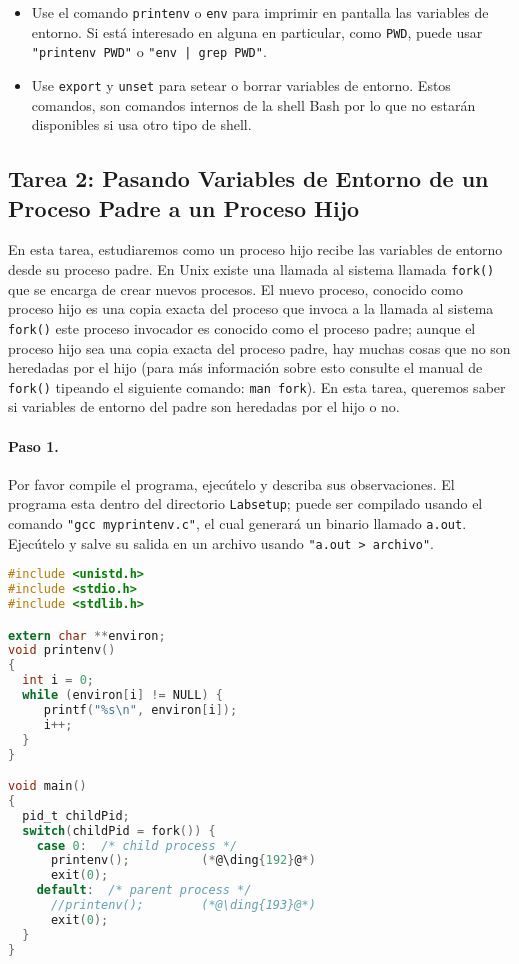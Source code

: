 \begin{itemize}
\item  Use el comando {\tt printenv} o {\tt env} para imprimir en pantalla las variables de entorno. Si está interesado en alguna en particular, como {\tt PWD}, puede usar {\tt "printenv PWD"} o {\tt "env | grep PWD"}.

\item Use {\tt export} y {\tt unset} para setear o borrar variables de entorno. Estos comandos, son comandos internos de la shell Bash por lo que no estarán disponibles si usa otro tipo de shell.
\end{itemize}


\subsection{Tarea 2: Pasando Variables de Entorno de un Proceso Padre a un Proceso Hijo}

En esta tarea, estudiaremos como un proceso hijo recibe las variables de entorno desde su proceso padre. En Unix existe una llamada al sistema llamada {\tt fork()} que se encarga de crear nuevos procesos. El nuevo proceso, conocido como proceso hijo es una copia exacta del proceso que invoca a la llamada al sistema  {\tt fork()} este proceso invocador es conocido como el proceso padre; aunque el proceso hijo sea una copia exacta del proceso padre, hay muchas cosas que no son heredadas por el hijo (para más información sobre esto consulte el manual de {\tt fork()} tipeando el siguiente comando: {\tt man fork}). En esta tarea, queremos saber si variables de entorno del padre son heredadas por el hijo o no.


\paragraph{Paso 1.} Por favor compile el programa, ejecútelo y describa sus observaciones. El programa esta dentro del directorio  \texttt{Labsetup}; puede ser compilado usando el comando \texttt{"gcc myprintenv.c"}, el cual generará un binario llamado \texttt{a.out}. Ejecútelo y salve su salida en un archivo usando 
\texttt{"a.out > archivo"}.

\begin{lstlisting}[language=C, caption={\texttt{myprintenv.c}}]
#include <unistd.h>
#include <stdio.h>
#include <stdlib.h>

extern char **environ;
void printenv()
{
  int i = 0;
  while (environ[i] != NULL) {
     printf("%s\n", environ[i]);
     i++;
  }
}

void main()
{
  pid_t childPid;
  switch(childPid = fork()) {
    case 0:  /* child process */
      printenv();          (*@\ding{192}@*)
      exit(0);
    default:  /* parent process */
      //printenv();        (*@\ding{193}@*)
      exit(0);
  }
}
\end{lstlisting}

